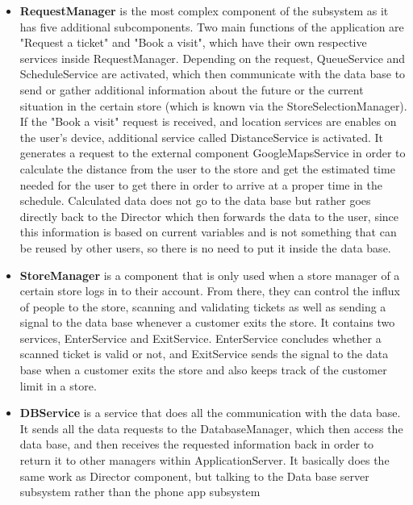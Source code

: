 \begin{itemize}
\newpage

\item \textbf{RequestManager} is the most complex component of the subsystem as it has five additional subcomponents. Two main functions of the application are "Request a ticket" and "Book a visit", which have their own respective services inside RequestManager. Depending on the request, QueueService and ScheduleService are activated, which then communicate with the data base to send or gather additional information about the future or the current situation in the certain store (which is known via the StoreSelectionManager). If the "Book a visit" request is received, and location services are enables on the user's device, additional service called DistanceService is activated. It generates a request to the external component GoogleMapsService in order to calculate the distance from the user to the store and get the estimated time needed for the user to get there in order to arrive at a proper time in the schedule. Calculated data does not go to the data base but rather goes directly back to the Director which then forwards the data to the user, since this information is based on current variables and is not something that can be reused by other users, so there is no need to put it inside the data base.  

\item \textbf{StoreManager} is a component that is only used when a store manager of a certain store logs in to their account. From there, they can control the influx of people to the store, scanning and validating tickets as well as sending a signal to the data base whenever a customer exits the store. It contains two services, EnterService and ExitService. EnterService concludes whether a scanned ticket is valid or not, and ExitService sends the signal to the data base when a customer exits the store and also keeps track of the customer limit in a store. 

\item \textbf{DBService} is a service that does all the communication with the data base. It sends all the data requests to the DatabaseManager, which then access the data base, and then receives the requested information back in order to return it to other managers within ApplicationServer. It basically does the same work as Director component, but talking to the Data base server subsystem rather than the phone app subsystem 
\end{itemize}


\newpage
